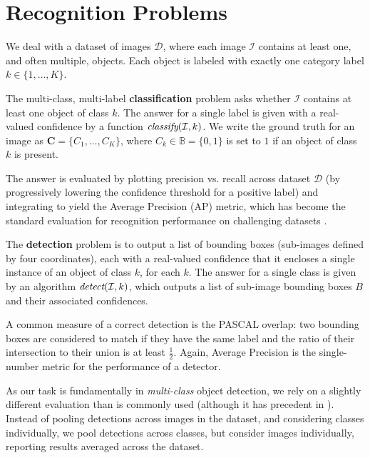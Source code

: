 \section{Recognition Problems}

We deal with a dataset of images $\mathcal{D}$, where each image $\mathcal{I}$ contains at least one, and often multiple, objects.
Each object is labeled with exactly one category label $k \in \{1, \dots, K\}$.

The multi-class, multi-label \textbf{classification} problem asks whether $\mathcal{I}$ contains at least one object of class $k$.
The answer for a single label is given with a real-valued confidence by a function $\emph{classify}(\mathcal{I},k)$.
We write the ground truth for an image as $\mathbf{C}=\{C_1,\dots,C_K\}$, where $C_k \in \mathbb{B} = \{0,1\}$ is set to $1$ if an object of class $k$ is present.

The answer is evaluated by plotting precision vs. recall across dataset $\mathcal{D}$ (by progressively lowering the confidence threshold for a positive label) and integrating to yield the Average Precision (AP) metric, which has become the standard evaluation for recognition performance on challenging datasets \cite{pascal-voc-2010}.


The \textbf{detection} problem is to output a list of bounding boxes (sub-images defined by four coordinates), each with a real-valued confidence that it encloses a single instance of an object of class $k$, for each $k$.
The answer for a single class is given by an algorithm $\emph{detect}(\mathcal{I},k)$, which outputs a list of sub-image bounding boxes $B$ and their associated confidences.

A common measure of a correct detection is the PASCAL overlap: two bounding boxes are considered to match if they have the same label and the ratio of their intersection to their union is at least $\frac{1}{2}$.
Again, Average Precision is the single-number metric for the performance of a detector.

As our task is fundamentally in \emph{multi-class} object detection, we rely on a slightly different evaluation than is commonly used (although it has precedent in \cite{Desai2009}).
Instead of pooling detections across images in the dataset, and considering classes individually, we pool detections across classes, but consider images individually, reporting results averaged across the dataset.

